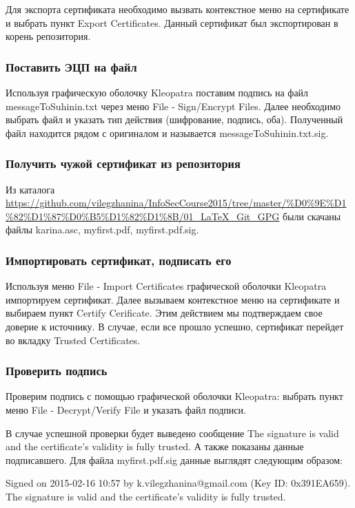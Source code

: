 \documentclass[a4paper, 12pt]{article}
\begin{document}
Для экспорта сертификата необходимо вызвать контекстное меню на сертификате и выбрать пункт Export Certificates. Данный сертификат был экспортирован в корень репозитория.

\subsubsection{Поставить ЭЦП на файл}

Используя графическую оболочку Kleopatra поставим подпись на файл messageToSuhinin.txt через меню File - Sign/Encrypt Files. Далее необходимо выбрать файл и указать тип действия (шифрование, подпись, оба). Полученный файл находится рядом с оригиналом  и называется messageToSuhinin.txt.sig.


\subsubsection{Получить чужой сертификат из репозитория}

Из каталога 
\url{https://github.com/vilegzhanina/InfoSecCourse2015/tree/master/%D0%9E%D1%82%D1%87%D0%B5%D1%82%D1%8B/01_LaTeX_Git_GPG}
были скачаны файлы karina.asc, myfirst.pdf, myfirst.pdf.sig. 

\subsubsection{Импортировать сертификат, подписать его}

Используя меню File - Import Certificates графической оболочки Kleopatra импортируем сертификат. Далее вызываем контекстное меню на сертификате и выбираем пункт Certify Cerificate. Этим действием мы подтверждаем свое доверие к источнику. В случае, если все прошло успешно, сертификат перейдет во вкладку Trusted Certificates.


\subsubsection{Проверить подпись}

Проверим подпись с помощью графической оболочки Kleopatra: выбрать пункт меню File - Decrypt/Verify File и указать файл подписи. 

В случае успешной проверки будет выведено сообщение The signature is valid and the certificate's validity is fully trusted. А также показаны данные подписавшего.  Для файла myfirst.pdf.sig данные выглядят следующим образом:

Signed on 2015-02-16 10:57 by k.vilegzhanina@gmail.com (Key ID: 0x391EA659).
The signature is valid and the certificate's validity is fully trusted.
\end{document}
